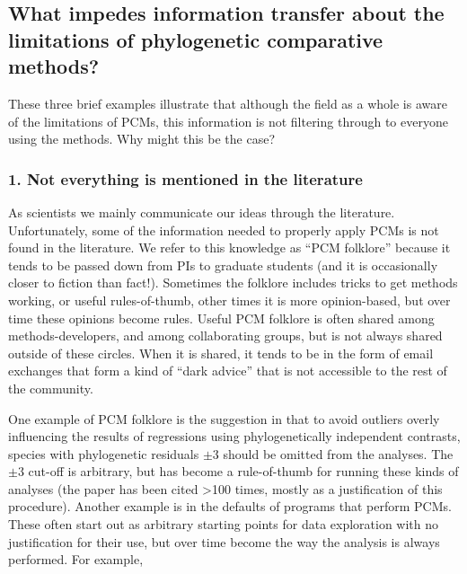\documentclass[a4paper,12pt]{article}
\begin{document}
\subsection{What impedes information transfer about the limitations of phylogenetic comparative  methods?}
These three brief examples illustrate that although the field as a whole is aware of the limitations of PCMs, this information is not filtering through to everyone using the methods. 
Why might this be the case?

  \subsubsection{1. Not everything is mentioned in the literature}
    As scientists we mainly communicate our ideas through the literature. 
    Unfortunately, some of the information needed to properly apply PCMs is not found in the literature. 
    We refer to this knowledge as ``PCM folklore'' because it tends to be passed down from PIs to graduate students (and it is occasionally closer to fiction than fact!).
    Sometimes the folklore includes tricks to get methods working, or useful rules-of-thumb, other times it is more opinion-based, but over time these opinions become rules. 
    Useful PCM folklore is often shared among methods-developers, and among collaborating groups, but is not always shared outside of these circles. 
    When it is shared, it tends to be in the form of email exchanges that form a kind of ``dark advice'' that is not accessible to the rest of the community.

    One example of PCM folklore is the suggestion in \citet{jones1997optimum} that to avoid outliers overly influencing the results of regressions using phylogenetically independent contrasts, species with phylogenetic residuals $\pm 3$ should be omitted from the analyses. %
    The $\pm 3$ cut-off is arbitrary, but has become a rule-of-thumb for running these kinds of analyses (the paper has been cited \textgreater 100 times, mostly as a justification of this procedure).
    Another example is in the defaults of programs that perform PCMs. 
    These often start out as arbitrary starting points for data exploration with no justification for their use, but over time become the way the analysis is always performed.
    For example, %
\end{document}

